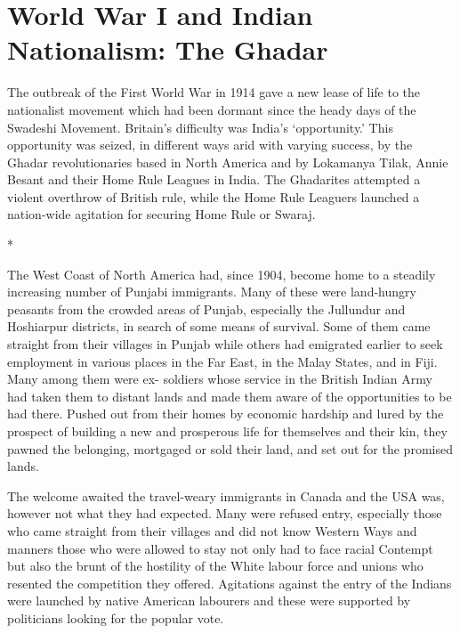 \chapter{World War I and Indian Nationalism: The Ghadar}

The outbreak of the First World War in 1914 gave a new lease of life to the nationalist movement which had been dormant since the heady days of the Swadeshi Movement. Britain’s difficulty was India’s ‘opportunity.’ This opportunity was seized, in different ways arid with varying success, by the Ghadar revolutionaries based in North America and by Lokamanya Tilak, Annie Besant and their Home Rule Leagues in India. The Ghadarites attempted a violent overthrow of British rule, while the Home Rule Leaguers launched a nation-wide agitation for securing Home Rule or Swaraj.

\begin{center}*\end{center}



The West Coast of North America had, since 1904, become home to a steadily increasing number of Punjabi immigrants. Many of these were land-hungry peasants from the crowded areas of Punjab, especially the Jullundur and Hoshiarpur districts, in search of some means of survival. Some of them came straight from their villages in Punjab while others had emigrated earlier to seek employment in various places in the Far East, in the Malay States, and in Fiji. Many among them were ex- soldiers whose service in the British Indian Army had taken them to distant lands and made them aware of the opportunities to be had there. Pushed out from their homes by economic hardship and lured by the prospect of building a new and prosperous life for themselves and their kin, they pawned the belonging, mortgaged or sold their land, and set out for the promised lands.

The welcome awaited the travel-weary immigrants in Canada and the USA was, however not what they had expected. Many were refused entry, especially those who came straight from their villages and did not know Western Ways and manners those who were allowed to stay not only had to face racial Contempt but also the brunt of the hostility of the White labour force and unions who resented the competition they offered. Agitations against the entry of the Indians were launched by native American labourers and these were supported by politicians looking for the popular vote.

